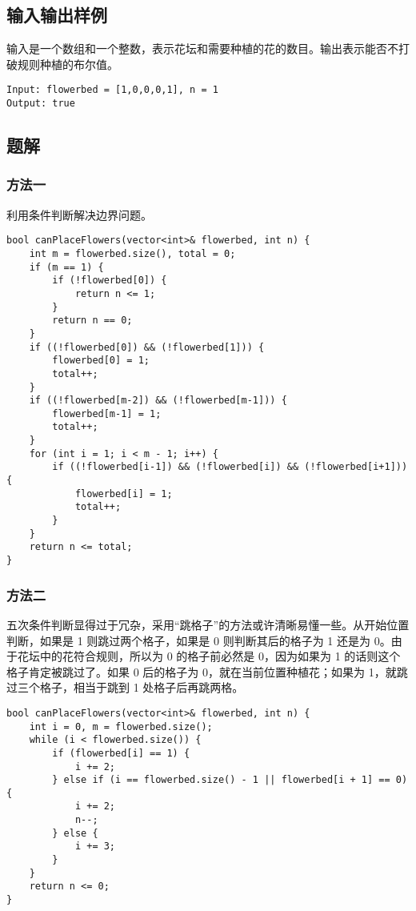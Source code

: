 \documentclass[lang=cn,10pt]{elegantbook}
\begin{document}
\subsection*{输入输出样例}

输入是一个数组和一个整数，表示花坛和需要种植的花的数目。输出表示能否不打破规则种植的布尔值。

\begin{lstlisting}
Input: flowerbed = [1,0,0,0,1], n = 1
Output: true
\end{lstlisting}

\subsection*{题解}

\subsubsection*{方法一}

利用条件判断解决边界问题。

\begin{lstlisting}
bool canPlaceFlowers(vector<int>& flowerbed, int n) {
	int m = flowerbed.size(), total = 0;
	if (m == 1) {
		if (!flowerbed[0]) {
			return n <= 1;
		}
		return n == 0;
	}
	if ((!flowerbed[0]) && (!flowerbed[1])) {
		flowerbed[0] = 1;
		total++;
	}
	if ((!flowerbed[m-2]) && (!flowerbed[m-1])) {
		flowerbed[m-1] = 1;
		total++;
	}
	for (int i = 1; i < m - 1; i++) {
		if ((!flowerbed[i-1]) && (!flowerbed[i]) && (!flowerbed[i+1])) {
			flowerbed[i] = 1;
			total++;
		}
	}
	return n <= total;
}
\end{lstlisting}

\subsubsection*{方法二}

五次条件判断显得过于冗杂，采用“跳格子”的方法或许清晰易懂一些。从开始位置判断，如果是 1 则跳过两个格子，如果是 0 则判断其后的格子为 1 还是为 0。由于花坛中的花符合规则，所以为 0 的格子前必然是 0，因为如果为 1 的话则这个格子肯定被跳过了。如果 0 后的格子为 0，就在当前位置种植花；如果为 1，就跳过三个格子，相当于跳到 1 处格子后再跳两格。

\begin{lstlisting}
bool canPlaceFlowers(vector<int>& flowerbed, int n) {
	int i = 0, m = flowerbed.size();
	while (i < flowerbed.size()) {
		if (flowerbed[i] == 1) {
			i += 2;
		} else if (i == flowerbed.size() - 1 || flowerbed[i + 1] == 0) {
			i += 2;
			n--;
		} else {
			i += 3;
		}
	}
	return n <= 0;
}
\end{lstlisting}
\end{document}
